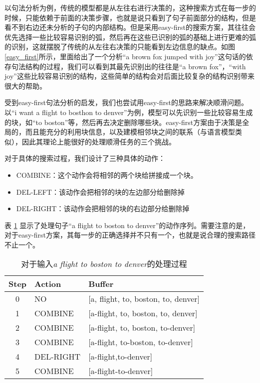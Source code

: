 以句法分析为例，传统的模型都是从左往右进行决策的，这种搜索方式在每一步的时候，只能依赖于前面的决策步骤，也就是说只看到了句子前面部分的结构，但是看不到右边还未分析的子句的内部结构。但是采用easy-first的搜索方案，其往往会优先选择一些比较容易识别的弧，然后再在这些已识别的弧的基础上进行更难的弧的识别，这就摆脱了传统的从左往右决策的只能看到左边信息的缺点。如图\ref{easy_first}所示，里面给出了一个分析“a brown fox jumped with joy”这句话的依存句法结构的过程，我们可以看到其最先识别出的往往是“a brown fox”，“with joy”这些比较容易识别的结构，这些简单的结构会对后面比较复杂的结构识别带来很大的帮助。

受到easy-first句法分析的启发，我们也尝试用easy-first的思路来解决顺滑问题。以“i want a flight to bosthon to denver”为例，模型可以先识别一些比较容易生成的块，如“to boston”等，然后再去决定删除哪些块。easy-first方案由于决策是全局的，而且能充分的利用块信息，以及建模相邻块之间的联系（与语言模型类似），因此其理论上能很好的处理顺滑任务的三个挑战。

对于具体的搜索过程，我们设计了三种具体的动作：
\begin{itemize}
	\item COMBINE：这个动作会将相邻的两个块给拼接成一个块。
	\item DEL-LEFT：该动作会把相邻的块的左边部分给删除掉
	\item DEL-RIGHT：该动作会把相邻的块的右边部分给删除掉
\end{itemize}
表 
\ref{action_sample1}
显示了处理句子“a flight to boston to denver”的动作序列。需要注意的是，对于easy-first方案，其每一步的正确选择并不只有一个，也就是说合理的搜索路径不止一个。
\begin{table}[htbp]
	\caption{对于输入\emph{a flight to boston to denver}的处理过程}
	\label{action_sample1}
	\vspace{-0.5em}
	\centering
	\begin{tabular}{c l l }
		\hline
		Step & Action &  Buffer   \\
		\hline\hline
		0 & NO&[a, flight, to, boston, to, denver]  \\
		1 & COMBINE & [a-flight, to, boston, to, denver]  \\
		2 & COMBINE & [a-flight,  to, boston, to-denver]   \\
		3 & COMBINE & [a-flight, to-boston, to-denver]   \\
		4 & DEL-RIGHT & [a-flight,to-denver]   \\
		5 & COMBINE & [a-flight-to-denver]  \\
		\hline
	\end{tabular}
\end{table}


